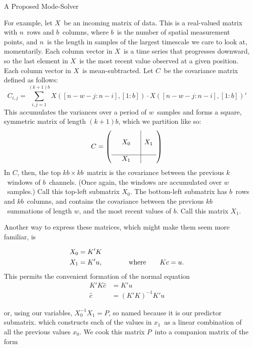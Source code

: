\documentclass[a4paper,10pt]{report}
\numberwithin{equation}{section}
\begin{document}
{\begin{chapter}
\begin{section}{A Proposed Mode-Solver}
\par
For example, let $X$\  be an incoming matrix of data. This is a real-valued matrix with $n$\  rows and $b$\  columns, where $b$\  is the number of spatial measurement points, and $n$\  is the length in samples of the largest timescale we care to look at, momentarily. Each column vector in $X$\  is a time series that progresses downward, so the last element in $X$\  is the most recent value observed at a given position. Each column vector in $X$\  is mean-subtracted. Let $C$\  be the covariance matrix defined as follows:
\begin{equation}
C_{i,j} = \sum_{i,j = 1}^{(k+1)b} X([n - w - j : n - i], [1:b]) \cdot X([n - w - j : n - i], [1:b])'
\end{equation}
This accumulates the variances over a period of $w$\  samples and forms a square, symmetric matrix of length $(k+1)b$, which we partition like so:
\begin{equation}
C = \left(
\begin{array}{c c c | c}
 {} & {} & {} &{} \\
 {} & X_0 & {} & X_1 \\
 {} & {} &  {} & {} \\
 \hline
 {} & X_1 & {} & {}
\end{array}
\right)
\end{equation}
In $C$, then, the top $kb \times kb$\  matrix is the covariance between the previous $k$\  windows of $b$\  channels. (Once again, the windows are accumulated over $w$\  samples.) Call this top-left submatrix $X_0$. The bottom-left submatrix has $b$\  rows and $kb$\  columns, and contains the covariance between the previous $kb$\  summations of length $w$, and the most recent values of $b$. Call this matrix $X_1$.
\par
Another way to express these matrices, which might make them seem more familiar, is
\begin{singlespace}
\begin{align}
X_0 &= K'K\notag\\
X_1 &= K'u \text{,} \qquad \qquad \text{where} \qquad
Kc = u \text{.} \notag\\
\end{align}
This permits the convenient formation of the normal equation
\begin{align*}
K'K\hat{c} &= K'u\\
\hat{c} &= (K'K)^{-1} K'u
\end{align*}
\end{singlespace}
or, using our variables, $X_0^{-1} X_1 = P$, so named because it is our predictor submatrix. which constructs each of the values in $x_1$\  as a linear combination of all the previous values $x_0$. We cook this matrix $P$\  into a companion matrix of the form

\end{section}
\end{chapter}}
\end{document}

